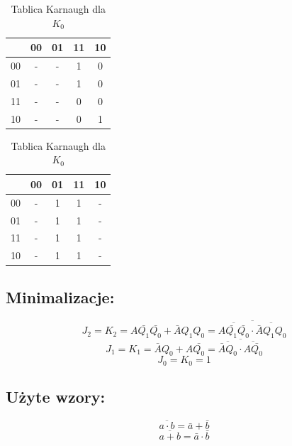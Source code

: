 \documentclass[12pt,a4paper]{article}
\begin{document}
\begin{table}[H]
\begin{minipage}{.5\textwidth}
					\caption{Tablica Karnaugh dla $K_1$}
					\vspace{0.2cm}
					\centering
					\begin{tabular}{c|c|c|c|c}
						\backslashbox{$AQ_2$}{$Q_1Q_0$}&00&01&11&10\\\hline
						00	&	-	&	-	&	1	&	0	\\\hline
						01	&	-	&	-	&	1	&	0	\\\hline
						11	&	-	&	-	&	0	&	0	\\\hline
						10	&	-	&	-	&	0	&	1	
					\end{tabular}
					
					\caption{Tablica Karnaugh dla $K_0$}
					\vspace{0.2cm}
					\centering
					\begin{tabular}{c|c|c|c|c}
						\backslashbox{$AQ_2$}{$Q_1Q_0$}&00&01&11&10\\\hline
						00	&	-	&	1	&	1	&	-	\\\hline
						01	&	-	&	1	&	1	&	-	\\\hline
						11	&	-	&	1	&	1	&	-	\\\hline
						10	&	-	&	1	&	1	&	-	
						
					\end{tabular}
				\end{minipage}
			\end{table}
			
			
		\subsection{Minimalizacje:}
			
			\begin{displaymath}
			J_2 = K_2 = A\bar{Q_1}\bar{Q_0} + \bar{A}Q_1Q_0 = \overline{\overline{A\bar{Q_1}\bar{Q_0}} \cdot \overline{\bar{A}Q_1Q_0}}
			\end{displaymath}
			\begin{displaymath}
			J_1 = K_1 = \bar{A}Q_0 + A\bar{Q_0}= \overline{\overline{\bar{A}Q_0} \cdot \overline{A\bar{Q_0}}}
			\end{displaymath}
			\begin{displaymath}
			J_0 = K_0 = 1
			\end{displaymath}
		
		
		\subsection{Użyte wzory:}
		
		\begin{equation}
		\overline{a\cdot b}=\bar{a}+\bar{b}
		\end{equation}
		\begin{equation}
		\overline{a+b}=\bar{a}\cdot\bar{b}
		\end{equation}
\end{document}
